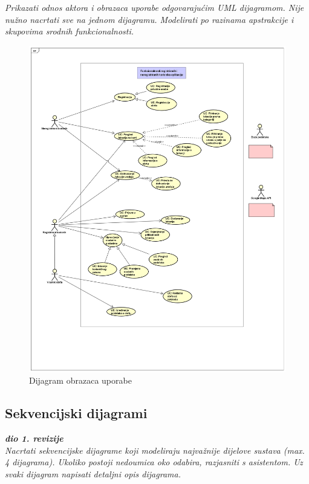 					\textit{Prikazati odnos aktora i obrazaca uporabe odgovarajućim UML dijagramom. Nije nužno nacrtati sve na jednom dijagramu. Modelirati po razinama apstrakcije i skupovima srodnih funkcionalnosti.}
					\begin{figure}[H]
						\includegraphics[scale=1.2]{slike/DijagramObrazacaUporabe1.png}
						\centering
						\caption{Dijagram obrazaca uporabe}
						\label{fig:promjene}
					\end{figure}
				\eject		
				
			\subsection{Sekvencijski dijagrami}
				
				\textbf{\textit{dio 1. revizije}}\\
				
				\textit{Nacrtati sekvencijske dijagrame koji modeliraju najvažnije dijelove sustava (max. 4 dijagrama). Ukoliko postoji nedoumica oko odabira, razjasniti s asistentom. Uz svaki dijagram napisati detaljni opis dijagrama.}
				\eject
	
